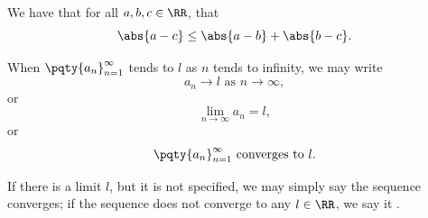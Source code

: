 \begin{proposition}
    We have that for all \(a, b, c \in \RR\), that
    \[
        \abs{a - c} \leq \abs{a - b} + \abs{b - c}.
    \]
\end{proposition}

\begin{notation}
    When \(\pqty{a_n}_{n = 1}^{\infty}\) tends to \(l\) as \(n\) tends to infinity, we may write
    \[
        a_n \to l \text{ as } n \to \infty,
    \]
    or
    \[
        \lim_{n \to \infty} a_n = l,
    \]
    or
    \[
        \pqty{a_n}_{n = 1}^{\infty} \text{ converges to } l.
    \]

    If there is a limit \(l\), but it is not specified, we may simply say the sequence converges; if the sequence does not converge to any \(l \in \RR\), we say it .
\end{notation}

